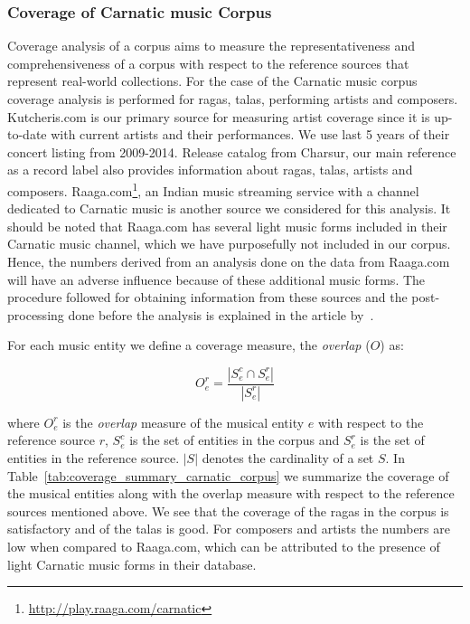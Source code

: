 \subsubsection{Coverage of Carnatic music Corpus}
\label{sec:corpus_coverage_of_carnatic_music_corpus}

Coverage analysis of a corpus aims to measure the representativeness and comprehensiveness of a corpus with respect to the reference sources that represent real-world collections. For the case of the Carnatic music corpus coverage analysis is performed for \glspl{raga}, \glspl{tala}, performing artists and composers. Kutcheris.com is our primary source for measuring artist coverage since it is up-to-date with current artists and their performances. We use last 5 years of their concert listing from 2009-2014. Release catalog from Charsur, our main reference as a record label also provides information about \glspl{raga}, \glspl{tala}, artists and composers. Raaga.com\footnote{\url{http://play.raaga.com/carnatic}}, an Indian music streaming service with a channel dedicated to Carnatic music is another source we considered for this analysis. It should be noted that Raaga.com has several light music forms included in their Carnatic music channel, which we have purposefully not included in our corpus. Hence, the numbers derived from an analysis done on the data from Raaga.com will have an adverse influence because of these additional music forms. The procedure followed for obtaining information from these sources and the post-processing done before the analysis is explained in the article by~\cite{CM_Corpora_Ajay14}.

For each music entity we define a coverage measure, the \textit{overlap} ($O$) as:

\begin{equation}
	O_{e}^{r} = \frac{ | S_{e}^{c} \cap S_{e}^{r} | }{ | S_{e}^{r} |}
	\label{eq:coverage_measure}
\end{equation}

\noindent where $O_{e}^{r}$ is the \textit{overlap} measure of the musical entity $e$ with respect to the reference source $r$, $S_{e}^{c}$ is the set of entities in the corpus and $S_{e}^{r}$ is the set of entities in the reference source. $|S|$ denotes the cardinality of a set $S$. In Table~\ref{tab:coverage_summary_carnatic_corpus} we summarize the coverage of the musical entities along with the overlap measure with respect to the reference sources mentioned above. We see that the coverage of the \glspl{raga} in the corpus is satisfactory and of the \glspl{tala} is good. For composers and artists the numbers are low when compared to Raaga.com, which can be attributed to the presence of light Carnatic music forms in their database. 

